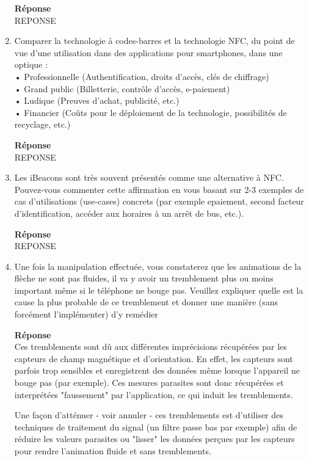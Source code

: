 \documentclass[a4paper]{article}
\begin{document}
\begin{enumerate}
    \textbf{Réponse} \\
    REPONSE
	
    \item Comparer la technologie à codes-barres et la technologie NFC, du point de vue d'une utilisation dans des applications pour smartphones, dans une optique : \\
    • Professionnelle (Authentification, droits d’accès, clés de chiffrage) \\
    • Grand public (Billetterie, contrôle d’accès, e-paiement) \\
    • Ludique (Preuves d'achat, publicité, etc.) \\
    • Financier (Coûts pour le déploiement de la technologie, possibilités de recyclage, etc.)
    
    \textbf{Réponse} \\
    REPONSE
    
    \item Les iBeacons sont très souvent présentés comme une alternative à NFC. Pouvez-vous commenter cette affirmation en vous basant sur 2-3 exemples de cas d’utilisations (use-cases) concrets (par exemple epaiement, second facteur d’identification, accéder aux horaires à un arrêt de bus, etc.).
    
    \textbf{Réponse} \\
    REPONSE
    
    \item Une fois la manipulation effectuée, vous constaterez que les animations de la flèche ne sont pas
    fluides, il va y avoir un tremblement plus ou moins important même si le téléphone ne bouge pas.
    Veuillez expliquer quelle est la cause la plus probable de ce tremblement et donner une manière (sans
    forcément l’implémenter) d’y remédier
    
    \textbf{Réponse} \\
    Ces tremblements sont dû aux différentes imprécisions récupérées par les capteurs de champ magnétique et d'orientation. En effet, les capteurs sont parfois trop sensibles et enregistrent des données même lorsque l'appareil ne bouge pas (par exemple). Ces mesures parasites sont donc récupérées et interprétées "faussement" par l'application, ce qui induit les tremblements.
    
    Une façon d'atténuer - voir annuler - ces tremblements est d'utiliser des techniques de traitement du signal (un filtre passe bas par exemple) afin de réduire les valeurs parasites ou "lisser" les données perçues par les capteurs pour rendre l'animation fluide et sans tremblements.
    
\end{enumerate}
\end{document}
